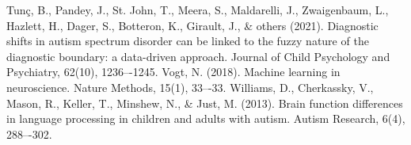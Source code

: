\documentclass[conference]{IEEEtran}
\begin{document}
\begin{thebibliography}{00}
     {Tunç, B., Pandey, J., St. John, T., Meera, S., Maldarelli, J., Zwaigenbaum, L., Hazlett, H., Dager, S., Botteron, K., Girault, J., \& others (2021). Diagnostic shifts in autism spectrum disorder can be linked to the fuzzy nature of the diagnostic boundary: a data-driven approach. Journal of Child Psychology and Psychiatry, 62(10), 1236–-1245.}
     {Vogt, N. (2018). Machine learning in neuroscience. Nature Methods, 15(1), 33–-33.}    
     {Williams, D., Cherkassky, V., Mason, R., Keller, T., Minshew, N., \& Just, M. (2013). Brain function differences in language processing in children and adults with autism. Autism Research, 6(4), 288–-302.}

\end{thebibliography}
\end{document}
